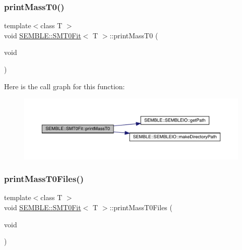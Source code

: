 \mbox{\label{structSEMBLE_1_1SMT0Fit_a7c2e4c02b18c8566b7609c9f58d467ee}} 
\subsubsection{\texorpdfstring{printMassT0()}{printMassT0()}\hspace{0.1cm}{\footnotesize\ttfamily [2/2]}}
{\footnotesize\ttfamily template$<$class T $>$ \\
void \mbox{\hyperlink{structSEMBLE_1_1SMT0Fit}{S\+E\+M\+B\+L\+E\+::\+S\+M\+T0\+Fit}}$<$ T $>$\+::print\+Mass\+T0 (\begin{DoxyParamCaption}\item[{void}]{ }\end{DoxyParamCaption})}

Here is the call graph for this function\+:
\nopagebreak
\begin{figure}[H]
\begin{center}
\leavevmode
\includegraphics[width=350pt]{d6/dad/structSEMBLE_1_1SMT0Fit_a7c2e4c02b18c8566b7609c9f58d467ee_cgraph}
\end{center}
\end{figure}
\mbox{\label{structSEMBLE_1_1SMT0Fit_a4143346724c18fdd7e82f34f585ed11d}} 
\subsubsection{\texorpdfstring{printMassT0Files()}{printMassT0Files()}\hspace{0.1cm}{\footnotesize\ttfamily [1/2]}}
{\footnotesize\ttfamily template$<$class T $>$ \\
void \mbox{\hyperlink{structSEMBLE_1_1SMT0Fit}{S\+E\+M\+B\+L\+E\+::\+S\+M\+T0\+Fit}}$<$ T $>$\+::print\+Mass\+T0\+Files (\begin{DoxyParamCaption}\item[{void}]{ }\end{DoxyParamCaption})}

